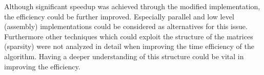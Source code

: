 \documentclass[12pt]{article}
\begin{document}
Although significant speedup was achieved through the modified implementation, the efficiency could be further improved. Especially parallel and low level (assembly) implementations could be considered as alternatives for this issue. Furthermore other techniques which could exploit the structure of the matrices (sparsity) were not analyzed in detail when improving the time efficiency of the algorithm. Having a deeper understanding of this structure could be vital in improving the efficiency.\\





\newpage


\end{document}
